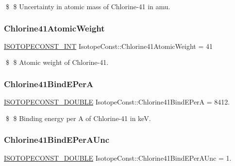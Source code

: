 \$ \$ Uncertainty in atomic mass of Chlorine-\/41 in amu. \mbox{\label{group___isotope_const-_chlorine-_cl41_gaf37e83dba25272ad4561d57f7f62c25d}} 
\subsubsection{\texorpdfstring{Chlorine41\+Atomic\+Weight}{Chlorine41AtomicWeight}}
{\footnotesize\ttfamily \mbox{\hyperlink{group___isotope_const-_macros_ga5f18360b3e99483a35c32d789e62621c}{I\+S\+O\+T\+O\+P\+E\+C\+O\+N\+S\+T\+\_\+\+I\+NT}} Isotope\+Const\+::\+Chlorine41\+Atomic\+Weight = 41}

\$ \$ Atomic weight of Chlorine-\/41. \mbox{\label{group___isotope_const-_chlorine-_cl41_gac3b5f5261ababa43e0993b517e8b79b9}} 
\subsubsection{\texorpdfstring{Chlorine41\+Bind\+E\+PerA}{Chlorine41BindEPerA}}
{\footnotesize\ttfamily \mbox{\hyperlink{group___isotope_const-_macros_ga8f45a7272ce02c0b4c65c44636ed719a}{I\+S\+O\+T\+O\+P\+E\+C\+O\+N\+S\+T\+\_\+\+D\+O\+U\+B\+LE}} Isotope\+Const\+::\+Chlorine41\+Bind\+E\+PerA = 8412.}

\$ \$ Binding energy per A of Chlorine-\/41 in keV. \mbox{\label{group___isotope_const-_chlorine-_cl41_ga0fd71a2abc292ff50d2fe664790d9407}} 
\subsubsection{\texorpdfstring{Chlorine41\+Bind\+E\+Per\+A\+Unc}{Chlorine41BindEPerAUnc}}
{\footnotesize\ttfamily \mbox{\hyperlink{group___isotope_const-_macros_ga8f45a7272ce02c0b4c65c44636ed719a}{I\+S\+O\+T\+O\+P\+E\+C\+O\+N\+S\+T\+\_\+\+D\+O\+U\+B\+LE}} Isotope\+Const\+::\+Chlorine41\+Bind\+E\+Per\+A\+Unc = 1.}


